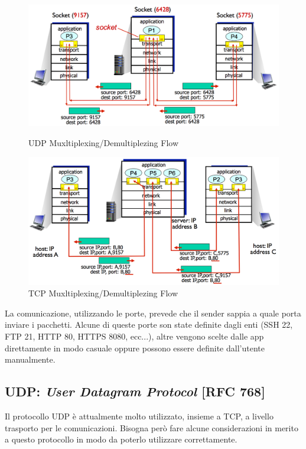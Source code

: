 \documentclass[12pt]{article}
\begin{document}
\begin{figure}[!hbpt]
  \includegraphics[width=\textwidth]{images/udp_mux.png}
  \caption{UDP Muxltiplexing/Demultiplezing Flow}
  \label{fig:udp_mux}

  \includegraphics[width=\textwidth]{images/tcp_mux.png}
  \caption{TCP Muxltiplexing/Demultiplezing Flow}
  \label{fig:tcp_mux}
\end{figure}

La comunicazione, utilizzando le porte, prevede che il sender sappia a quale porta inviare i pacchetti. Alcune di queste porte son state definite dagli enti (SSH 22, FTP 21, HTTP 80, HTTPS 8080, ecc...), altre vengono scelte dalle app direttamente in modo casuale oppure possono essere definite dall'utente manualmente.

\subsection{UDP: \textit{User Datagram Protocol} [RFC 768]} %
Il protocollo UDP è attualmente molto utilizzato, insieme a TCP, a livello trasporto per le comunicazioni. Bisogna però fare alcune considerazioni in merito a questo protocollo in modo da poterlo utilizzare correttamente.\\
\end{document}
